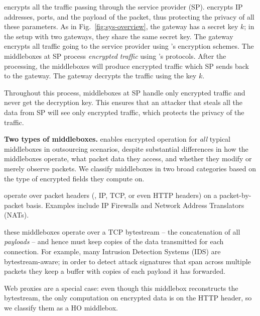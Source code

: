  \sys encrypts all the traffic passing through the service provider (SP).
\sys encrypts IP addresses, ports, and the payload of the packet, thus protecting the privacy of all these parameters. 
As in Fig.~\ref{fig:sys-overview}, the gateway has a secret key $k$; in the setup with two gateways, they share
the same secret key. The gateway encrypts all traffic going to the service provider using \sys's encryption schemes.
The middleboxes at SP process {\em encrypted traffic} using \sys's protocols. 
After the processing, the middleboxes
will produce encrypted traffic which SP sends back to the gateway. The gateway decrypts the traffic using the key $k$.

Throughout this process, middleboxes at SP handle only encrypted traffic and never get the decryption key. This ensures
that an attacker that steals all the data from SP will  see only encrypted traffic, which protects the privacy of the 
traffic. 

\eat
\noindent\textbf{Two types of middleboxes.} \sys enables encrypted operation for {\em all} typical middleboxes in outsourcing scenarios, despite substantial differences in how the middleboxes operate, what packet data they access, and whether they modify or merely observe packets.
  We classify middleboxes in  two broad categories based on the type of encrypted fields  they compute on.

 operate over packet headers (\eg{}, IP, TCP, or even HTTP headers) on a packet-by-packet basis.
Examples  include IP Firewalls and Network Address Translators (NATs). 

 these middleboxes operate over a TCP bytestream -- the concatenation of all {\it payloads} -- and hence must keep copies of the data transmitted for each connection.
  For example, many Intrusion Detection Systems (IDS) are bytestream-aware; in order to detect attack signatures that span across multiple packets they keep a buffer  with copies of each payload it has forwarded.


 Web proxies are a special case: even though this middlebox reconstructs the bytestream, the only computation on encrypted data is on the HTTP header, so we classify them as a HO middlebox. 
 
